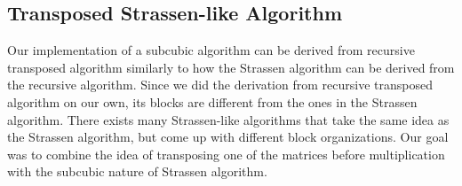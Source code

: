 \documentclass[a4paper,11pt]{article}
\begin{document}





\subsection{Transposed Strassen-like Algorithm}

Our implementation of a subcubic algorithm can be derived from recursive transposed algorithm similarly to how the Strassen algorithm can be derived from the recursive algorithm. 
Since we did the derivation from recursive transposed algorithm on our own, its blocks are different from the ones in the Strassen algorithm. There exists many Strassen-like algorithms that take the same idea as the Strassen algorithm, but come up with different block organizations. Our goal was to combine the idea of transposing one of the matrices before multiplication with the subcubic nature of Strassen algorithm.
\end{document}
